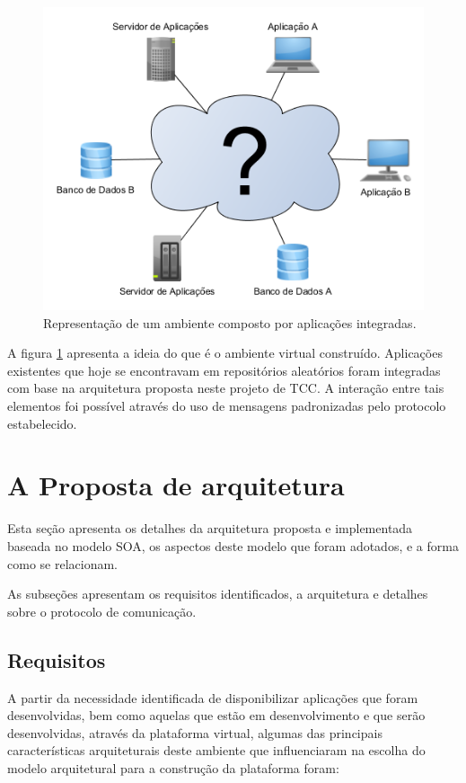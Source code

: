 \begin{figure}[!hbt]
\centering
\includegraphics[scale=0.7]{figuras/ambiente_virtual.png}
\caption{Representação de um ambiente composto por aplicações integradas.}
\label{ambiente_virtual}
\end{figure}

A figura \ref{ambiente_virtual} apresenta a ideia do que é o ambiente virtual construído. Aplicações existentes que hoje se encontravam em repositórios aleatórios foram integradas com base na arquitetura proposta neste projeto de TCC. A interação entre tais elementos foi possível através do uso de mensagens padronizadas pelo protocolo estabelecido.

\section{A Proposta de arquitetura}

Esta seção apresenta os detalhes da arquitetura proposta e implementada baseada no modelo SOA, os aspectos deste modelo que foram adotados, e a forma como se relacionam.

As subseções apresentam os requisitos identificados, a arquitetura e detalhes sobre o protocolo de comunicação.

\subsection{Requisitos}
A partir da necessidade identificada de disponibilizar aplicações que foram desenvolvidas, bem como aquelas que estão em desenvolvimento e que serão desenvolvidas, através da plataforma virtual, algumas das principais características arquiteturais deste ambiente que influenciaram na escolha do modelo arquitetural para a construção da plataforma foram:

